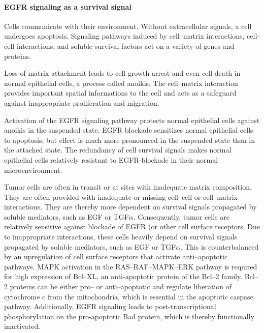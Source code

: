 {{{      \paragraph{EGFR signaling as a survival signal}

        Cells communicate with their environment. Without extracellular signals,
        a cell undergoes apoptosis. Signaling pathways induced by cell--matrix
        interactions, cell-cell interactions, and soluble survival factors act
        on a variety of genes and proteins.

        Loss of matrix attachment leads to cell growth arrest and even cell
        death in normal epithelial cells, a process called anoikis. The
        cell--matrix interaction provides important spatial informations to the
        cell and acts as a safeguard against inappropriate proliferation and
        migration.

        Activation of the EGFR signaling pathway protects normal
        epithelial cells against anoikis in the suspended state. EGFR blockade
        sensitizes normal epithelial cells to apoptosis, but effect is much
        more pronounced in the suspended state than in the attached state. The
        redundancy of cell survival signals makes normal epithelial cells
        relatively resistant to EGFR-blockade in their normal microenvironment.

        Tumor cells are often in transit or at sites with inadequate matrix
        composition. They are often provided with inadequate or missing
        cell--cell or cell--matrix interactions. They are thereby more dependent
        on survival signals propagated by soluble mediators, such as EGF or
        TGF$\alpha$.  Consequently, tumor cells are relatively sensitive against
        blockade of EGFR (or other cell surface receptors. Due to inappropriate
        interactions, these cells heavily depend on survival signals propagated
        by soluble mediators, such as EGF or TGF$\alpha$. This is
        counterbalanced by an upregulation of cell surface receptors that
        activate anti--apoptotic pathways. MAPK activation in the
        RAS--RAF--MAPK--ERK pathway is required for high expression of Bcl--XL,
        an anti-apoptotic protein of the Bcl--2 family. Bcl--2 proteins can be
        either pro-- or anti--apoptotic and regulate liberation of cytochrome c
        from the mitochondria, which is essential in the apoptotic caspase
        pathway. Additionally, EGFR signaling leads to post-transcriptional
        phosphorylation on the pro-apoptotic Bad protein, which is thereby
        functionally inactivated.

}}}
